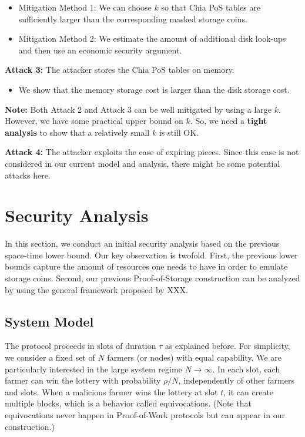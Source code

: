 \documentclass[12pt, onecolumn]{IEEEtran}
\begin{document}
\begin{itemize}
    \item Mitigation Method 1: We can choose $k$ so that Chia PoS tables are sufficiently larger than the corresponding masked storage coins.
    \item Mitigation Method 2: We estimate the amount of additional disk look-ups and then use an economic security argument.
\end{itemize}

{\bf Attack 3:} The attacker stores the Chia PoS tables on memory.

\begin{itemize}
    \item We show that the memory storage cost is larger than the disk storage cost.
\end{itemize}

{\bf Note:} Both Attack 2 and Attack 3 can be well mitigated by using a large $k$. However, we have some practical upper bound on $k$. So, we need a {\bf tight analysis} to show that a relatively small $k$ is still OK.

{\bf Attack 4:} The attacker exploits the case of expiring pieces. Since this case is not considered in our current model and analysis, there might be some potential attacks here.





\section{Security Analysis}

In this section, we conduct an initial security analysis based on the previous space-time lower bound.
Our key observation is twofold. First, the previous lower bounds capture the amount of resources one needs 
to have in order to emulate storage coins. Second, our previous Proof-of-Storage construction can be analyzed
by using the general framework proposed by XXX.

\subsection{System Model}


The protocol proceeds in slots of duration $\tau$ as explained before. For simplicity, we consider a fixed set of $N$ farmers (or nodes) with equal capability. We
are particularly interested in the large system regime $N \to \infty$. In each slot, each farmer can win the lottery with probability $\rho / N$,
independently of other farmers and slots. When a malicious farmer wins the lottery at slot $t$, it can create multiple blocks, which is a behavior called equivocations. (Note that equivocations never happen in Proof-of-Work protocols but can appear in our construction.)
\end{document}
